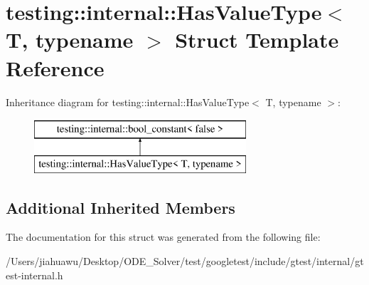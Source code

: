 \hypertarget{structtesting_1_1internal_1_1_has_value_type}{}\section{testing\+:\+:internal\+:\+:Has\+Value\+Type$<$ T, typename $>$ Struct Template Reference}
\label{structtesting_1_1internal_1_1_has_value_type}
Inheritance diagram for testing\+:\+:internal\+:\+:Has\+Value\+Type$<$ T, typename $>$\+:\begin{figure}[H]
\begin{center}
\leavevmode
\includegraphics[height=2.000000cm]{structtesting_1_1internal_1_1_has_value_type}
\end{center}
\end{figure}
\subsection*{Additional Inherited Members}


The documentation for this struct was generated from the following file\+:\begin{DoxyCompactItemize}
\item 
/\+Users/jiahuawu/\+Desktop/\+O\+D\+E\+\_\+\+Solver/test/googletest/include/gtest/internal/gtest-\/internal.\+h\end{DoxyCompactItemize}

